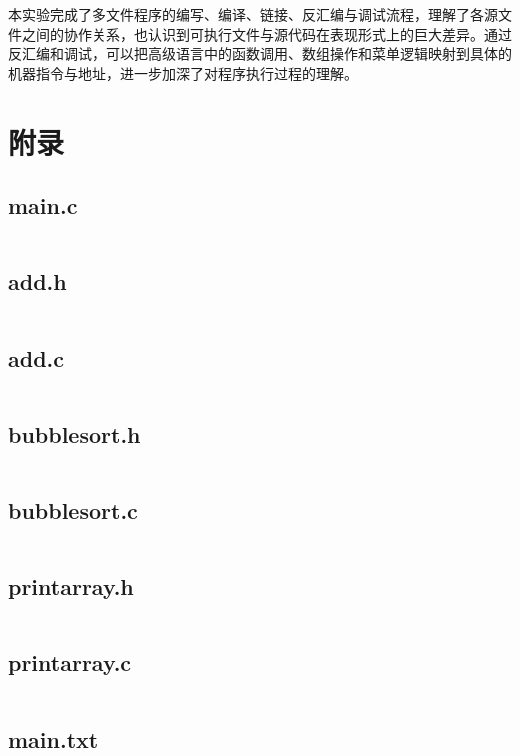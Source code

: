 \documentclass[12pt, a4paper]{academics}
\begin{document}
本实验完成了多文件程序的编写、编译、链接、反汇编与调试流程，理解了各源文件之间的协作关系，也认识到可执行文件与源代码在表现形式上的巨大差异。通过反汇编和调试，可以把高级语言中的函数调用、数组操作和菜单逻辑映射到具体的机器指令与地址，进一步加深了对程序执行过程的理解。

\appendix
\section{附录}

\subsection{main.c}
\inputminted{c}{../src/main.c}

\subsection{add.h}
\inputminted{c}{../src/add.h}

\subsection{add.c}
\inputminted{c}{../src/add.c}

\subsection{bubblesort.h}
\inputminted{c}{../src/bubblesort.h}

\subsection{bubblesort.c}
\inputminted{c}{../src/bubblesort.c}

\subsection{printarray.h}
\inputminted{c}{../src/printarray.h}

\subsection{printarray.c}
\inputminted{c}{../src/printarray.c}

\subsection{main.txt}
\inputminted{text}{../res/main.txt}
\end{document}
